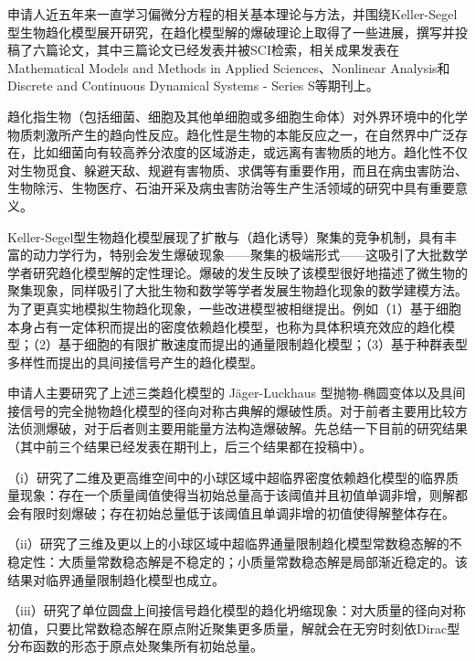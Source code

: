 \documentclass[12pt]{article}
\begin{document}
{


}


申请人近五年来一直学习偏微分方程的相关基本理论与方法，并围绕Keller-Segel型生物趋化模型展开研究，在趋化模型解的爆破理论上取得了一些进展，撰写并投稿了六篇论文，其中三篇论文已经发表并被SCI检索，相关成果发表在Mathematical Models and Methods in Applied Sciences、Nonlinear Analysis和Discrete and Continuous Dynamical Systems - Series S等期刊上。%

趋化指生物（包括细菌、细胞及其他单细胞或多细胞生命体）对外界环境中的化学物质刺激所产生的趋向性反应。趋化性是生物的本能反应之一，在自然界中广泛存在，比如细菌向有较高养分浓度的区域游走，或远离有害物质的地方。趋化性不仅对生物觅食、躲避天敌、规避有害物质、求偶等有重要作用，而且在病虫害防治、生物除污、生物医疗、石油开采及病虫害防治等生产生活领域的研究中具有重要意义。

Keller-Segel型生物趋化模型展现了扩散与（趋化诱导）聚集的竞争机制，具有丰富的动力学行为，特别会发生爆破现象——聚集的极端形式——这吸引了大批数学学者研究趋化模型解的定性理论。爆破的发生反映了该模型很好地描述了微生物的聚集现象，同样吸引了大批生物和数学等学者发展生物趋化现象的数学建模方法。为了更真实地模拟生物趋化现象，一些改进模型被相继提出。例如（1）基于细胞本身占有一定体积而提出的密度依赖趋化模型，也称为具体积填充效应的趋化模型；（2）基于细胞的有限扩散速度而提出的通量限制趋化模型；（3）基于种群表型多样性而提出的具间接信号产生的趋化模型。

申请人主要研究了上述三类趋化模型的 J\"ager-Luckhaus 型抛物-椭圆变体以及具间接信号的完全抛物趋化模型的径向对称古典解的爆破性质。对于前者主要用比较方法侦测爆破，对于后者则主要用能量方法构造爆破解。先总结一下目前的研究结果（其中前三个结果已经发表在期刊上，后三个结果都在投稿中）。

（i）研究了二维及更高维空间中的小球区域中超临界密度依赖趋化模型的临界质量现象：存在一个质量阈值使得当初始总量高于该阈值并且初值单调非增，则解都会有限时刻爆破；存在初始总量低于该阈值且单调非增的初值使得解整体存在。

（ii）研究了三维及更以上的小球区域中超临界通量限制趋化模型常数稳态解的不稳定性：大质量常数稳态解是不稳定的；小质量常数稳态解是局部渐近稳定的。该结果对临界通量限制趋化模型也成立。

（iii）研究了单位圆盘上间接信号趋化模型的趋化坍缩现象：对大质量的径向对称初值，只要比常数稳态解在原点附近聚集更多质量，解就会在无穷时刻依Dirac型分布函数的形态于原点处聚集所有初始总量。
\end{document}
